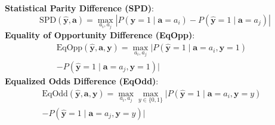 \noindent
\textbf{Statistical Parity Difference (SPD)}:
$$
\text{SPD}(\hat {\mathbf y}, \mathbf a ) =
    \max_{a_i, a_j}|P(\hat{\mathbf y}=1\mid \mathbf a=a_i)-P(\hat{\mathbf y}=1\mid \mathbf a =a_j)|
$$
\textbf{Equality of Opportunity Difference (EqOpp)}:
\begin{align*}
\text{EqOpp}(\hat {\mathbf y}, \mathbf a, \mathbf y) =
    \max_{a_i, a_j} |P(\hat{\mathbf y}=1\mid\mathbf a = a_i,\mathbf y=1)&\\-P(\hat{\mathbf y}=1\mid\mathbf a = a_j,\mathbf y=1)|
\end{align*}
\textbf{Equalized Odds Difference (EqOdd)}:
\begin{align*}
\text{EqOdd}(\hat {\mathbf y}, \mathbf a, \mathbf y) = 
\max_{a_i, a_j} \max_{y\in\{0,1\}} |P(\hat{\mathbf y}=1\mid\mathbf a = a_i,\mathbf y=y)&\\- P(\hat{\mathbf y}=1\mid\mathbf a = a_j,\mathbf y=y)|
\end{align*}


